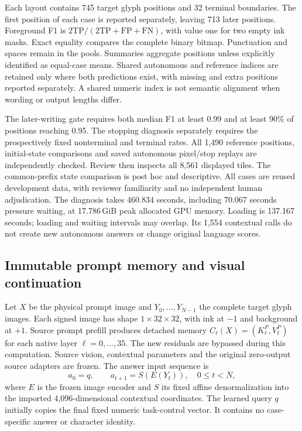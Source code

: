 \documentclass[12pt,a4paper]{article}
\providecommand{\DIFadd}[1]{{\protect\color{blue} \sf #1}} %
\begin{document}
\DIFadd{Each layout contains 745 target glyph positions and 32 terminal boundaries.
The first position of each case is reported separately, leaving 713 later
positions. Foreground F1 is $2\mathrm{TP}/(2\mathrm{TP}+\mathrm{FP}+\mathrm{FN})$,
with value one for two empty ink masks. Exact equality compares the complete
binary bitmap. Punctuation and spaces remain in the pools. Summaries aggregate
positions unless explicitly identified as equal-case means. Shared autonomous
and reference indices are retained only where both predictions exist, with
missing and extra positions reported separately. A shared numeric index is not
semantic alignment when wording or output lengths differ.
}

\DIFadd{The later-writing gate requires both median F1 at least 0.99 and at least
90\% of positions reaching 0.95. The stopping diagnosis separately requires
the prospectively fixed nonterminal and terminal rates. All 1,490 reference
positions, initial-state comparisons and saved autonomous pixel/stop replays
are independently checked. Review then inspects all 8,561 displayed tiles.
The common-prefix state comparison is post hoc and descriptive. All cases are
reused development data, with reviewer familiarity and no independent human
adjudication. The diagnosis takes 460.834 seconds, including 70.067 seconds
pressure waiting, at 17.786\,GiB peak allocated GPU memory. Loading is 137.167
seconds; loading and waiting intervals may overlap. Its 1,554 contextual calls
do not create new autonomous answers or change original language scores.
}

\subsection*{\DIFadd{Immutable prompt memory and visual continuation}}
\DIFadd{Let $X$ be the physical prompt image and $Y_0,\ldots,Y_{N-1}$ the complete target
glyph images. Each signed image has shape $1\times32\times32$, with ink at
$-1$ and background at $+1$. Source prompt prefill produces detached memory
$C_\ell(X)=(K^P_\ell,V^P_\ell)$ for each native layer
$\ell=0,\ldots,35$. The new residuals are bypassed during this computation.
Source vision, contextual parameters and the original zero-output source
adapters are frozen. The answer input sequence is
}\begin{equation}
 a_0=q,\qquad a_{t+1}=S(E(Y_t)),\quad 0\leq t<N,
 \label{eq:continuation-input}
\end{equation}
\DIFadd{where $E$ is the frozen image encoder and $S$ its fixed affine denormalization
into the imported 4,096-dimensional contextual coordinates. The learned query
$q$ initially copies the final fixed numeric task-control vector. It contains
no case-specific answer or character identity.
}
\end{document}

